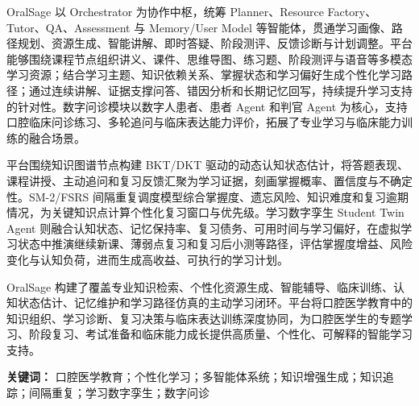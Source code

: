 \documentclass[a4paper]{report}
\begin{document}
OralSage 以 Orchestrator 为协作中枢，统筹 Planner、Resource Factory、Tutor、QA、Assessment 与 Memory/User Model 等智能体，贯通学习画像、路径规划、资源生成、智能讲解、即时答疑、阶段测评、反馈诊断与计划调整。平台能够围绕课程节点组织讲义、课件、思维导图、练习题、阶段测评与语音等多模态学习资源；结合学习主题、知识依赖关系、掌握状态和学习偏好生成个性化学习路径；通过连续讲解、证据支撑问答、错因分析和长期记忆回写，持续提升学习支持的针对性。数字问诊模块以数字人患者、患者 Agent 和判官 Agent 为核心，支持口腔临床问诊练习、多轮追问与临床表达能力评价，拓展了专业学习与临床能力训练的融合场景。

平台围绕知识图谱节点构建 BKT/DKT 驱动的动态认知状态估计，将答题表现、课程讲授、主动追问和复习反馈汇聚为学习证据，刻画掌握概率、置信度与不确定性。SM-2/FSRS 间隔重复调度模型综合掌握度、遗忘风险、知识难度和复习逾期情况，为关键知识点计算个性化复习窗口与优先级。学习数字孪生 Student Twin Agent 则融合认知状态、记忆保持率、复习债务、可用时间与学习偏好，在虚拟学习状态中推演继续新课、薄弱点复习和复习后小测等路径，评估掌握度增益、风险变化与认知负荷，进而生成高收益、可执行的学习计划。

OralSage 构建了覆盖专业知识检索、个性化资源生成、智能辅导、临床训练、认知状态估计、记忆维护和学习路径仿真的主动学习闭环。平台将口腔医学教育中的知识组织、学习诊断、复习决策与临床表达训练深度协同，为口腔医学生的专题学习、阶段复习、考试准备和临床能力成长提供高质量、个性化、可解释的智能学习支持。

\noindent\textbf{关键词：} 口腔医学教育；个性化学习；多智能体系统；知识增强生成；知识追踪；间隔重复；学习数字孪生；数字问诊



















\cleardoublepage
{}
{}


\end{document}
